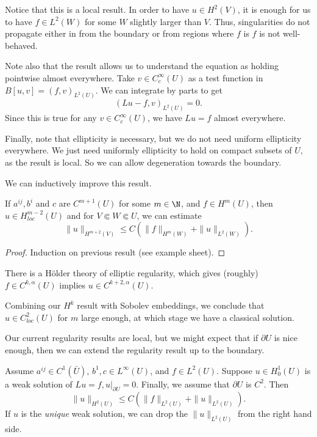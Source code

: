 \documentclass[a4paper]{article}
\begin{document}
Notice that this is a local result. In order to have $u \in H^2(V)$, it is enough for us to have $f \in L^2(W)$ for some $W$ slightly larger than $V$. Thus, singularities do not propagate either in from the boundary or from regions where $f$ is $f$ is not well-behaved.

Note also that the result allows us to understand the equation as holding pointwise almost everywhere. Take $v \in C_c^\infty(U)$ as a test function in $B[u, v] = (f, v)_{L^2(U)}$. We can integrate by parts to get
\[
  (Lu - f, v)_{L^2(U)} = 0.
\]
Since this is true for any $v \in C_c^\infty(U)$, we have $Lu = f$ almost everywhere.

Finally, note that ellipticity is necessary, but we do not need uniform ellipticity everywhere. We just need uniformly ellipticity to hold on compact subsets of $U$, as the result is local. So we can allow degeneration towards the boundary.

We can inductively improve this result.
\begin{thm}
  If $a^{ij}, b^i$ and $c$ are $C^{m + 1}(U)$ for some $m \in \N$, and $f \in H^m(U)$, then $u \in H^{m - 2}_{loc}(U)$ and for $V \Subset W \Subset U$, we can estimate
  \[
    \|u\|_{H^{m + 2}(V)} \leq C (\|f\|_{H^m(W)} + \|u\|_{L^2(W)}).
  \]
\end{thm}

\begin{proof}
  Induction on previous result (see example sheet).
\end{proof}
There is a H\"older theory of elliptic regularity, which gives (roughly) $f \in C^{k, \alpha}(U)$ implies $u \in C^{k + 2, \alpha}(U)$.

Combining our $H^k$ result with Sobolev embeddings, we conclude that $u \in C^2_{loc}(U)$ for $m$ large enough, at which stage we have a classical solution.

Our current regularity results are local, but we might expect that if $\partial U$ is nice enough, then we can extend the regularity result up to the boundary.

\begin{thm}
  Assume $a^{ij} \in C^1(\bar{U})$, $b^1, c \in L^\infty(U)$, and $f \in L^2(U)$. Suppose $u \in H_0^1(U)$ is a weak solution of $Lu = f, u|_{\partial U} = 0$. Finally, we assume that $\partial U$ is $C^2$. Then
  \[
    \|u\|_{H^2(U)} \leq C (\|f\|_{L^2(U)} + \|u\|_{L^2(U)}).
  \]
  If $u$ is the \emph{unique} weak solution, we can drop the $\|u\|_{L^2(U)}$ from the right hand side.
\end{thm}
\end{document}
